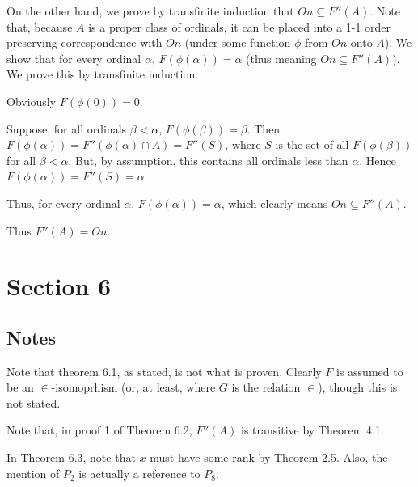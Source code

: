 \documentclass{article}
\theoremstyle{definition}
\begin{document}
On the other hand, we prove by transfinite induction that $On\subseteq F''(A)$. Note that, because $A$ is a proper class 
of ordinals, it can be placed into a 1-1 order preserving correspondence with $On$ (under some function $\phi$ from $On$ onto $A$). We show that 
for every ordinal $\alpha$, $F(\phi(\alpha))=\alpha$ (thus meaning $On\subseteq F''(A))$. We prove this by transfinite induction.

Obviously $F(\phi(0))=0$.

Suppose, for all ordinals $\beta<\alpha$, $F(\phi(\beta))=\beta$. Then 
$F(\phi(\alpha))=F''(\phi(\alpha)\cap A)=F''(S)$, where $S$ is the set of all $F(\phi(\beta))$ for all 
$\beta<\alpha$. But, by assumption, this contains all ordinals less than $\alpha$. Hence 
$F(\phi(\alpha))=F''(S)=\alpha$.

Thus, for every ordinal $\alpha$, $F(\phi(\alpha))=\alpha$, which clearly means $On\subseteq F''(A)$.

Thus $F''(A)=On$.

\section*{Section 6}

\subsection*{Notes}
Note that theorem 6.1, as stated, is not what is proven. Clearly $F$ is assumed to be an 
$\in$-isomoprhism (or, at least, where $G$ is the relation $\in$), though this is not stated.

Note that, in proof 1 of Theorem 6.2, $F''(A)$ is transitive by Theorem 4.1.

In Theorem 6.3, note that $x$ must have some rank by Theorem 2.5. Also, the mention of $P_2$ is actually 
a reference to $P_8$.
\end{document}
